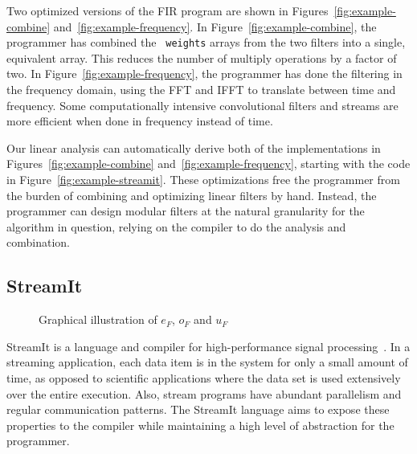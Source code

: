 Two optimized versions of the FIR program are shown in
Figures~\ref{fig:example-combine} and~\ref{fig:example-frequency}.  In
Figure~\ref{fig:example-combine}, the programmer has combined the {\tt
weights} arrays from the two filters into a single, equivalent array.
This reduces the number of multiply operations by a factor of two.  In
Figure~\ref{fig:example-frequency}, the programmer has done the
filtering in the frequency domain, using the FFT and IFFT to translate
between time and frequency.  Some computationally intensive
convolutional filters and streams are more efficient when done in
frequency instead of time.

Our linear analysis can automatically derive both of the
implementations in Figures~\ref{fig:example-combine}
and~\ref{fig:example-frequency}, starting with the code in
Figure~\ref{fig:example-streamit}.  These optimizations free the
programmer from the burden of combining and optimizing linear filters
by hand.  Instead, the programmer can design modular filters at the
natural granularity for the algorithm in question, relying on the
compiler to do the analysis and combination.

\subsection{StreamIt}

\begin{figure}
\center
\epsfxsize=3.0in
\caption{Graphical illustration of $e_{F}$, $o_{F}$ and $u_{F}$}
\label{fig:overview-filter}
\end{figure}

StreamIt is a language and compiler for high-performance signal
processing~\cite{gordon-thesis,streamit-asplos,streamitcc}.  In a
streaming application, each data item is in the system for only a
small amount of time, as opposed to scientific applications where the
data set is used extensively over the entire execution.  Also, stream
programs have abundant parallelism and regular communication patterns.
The StreamIt language aims to expose these properties to the compiler
while maintaining a high level of abstraction for the programmer.

